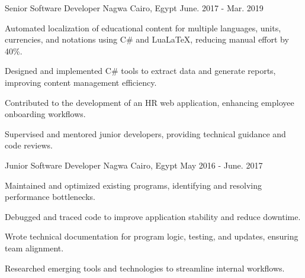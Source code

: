 \begin{cventries}
  \cventry
  {Senior Software Developer} %
  {Nagwa} %
  {Cairo, Egypt} %
  {June. 2017 - Mar. 2019} %
  {
    \begin{cvitems} %
      \item {Automated localization of educational content for multiple languages, units, currencies, and notations using C\# and LuaLaTeX, reducing manual effort by 40\%.}
      \item {Designed and implemented C# tools to extract data and generate reports, improving content management efficiency.}
      \item {Contributed to the development of an HR web application, enhancing employee onboarding workflows.}
      \item {Supervised and mentored junior developers, providing technical guidance and code reviews.}
    \end{cvitems}
  }
  \cventry
  {Junior Software Developer} %
  {Nagwa} %
  {Cairo, Egypt} %
  {May 2016 - June. 2017} %
  {
    \begin{cvitems} %
      \item {Maintained and optimized existing programs, identifying and resolving performance bottlenecks.}
      \item {Debugged and traced code to improve application stability and reduce downtime.}
      \item {Wrote technical documentation for program logic, testing, and updates, ensuring team alignment.}
      \item {Researched emerging tools and technologies to streamline internal workflows.}
    \end{cvitems}
  }



\end{cventries}
